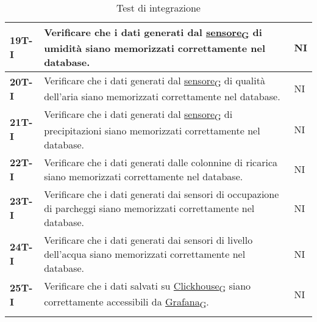 \begin{longtable}{|>{\raggedright\arraybackslash}m{}|>{\raggedright\arraybackslash}m{}|>{\raggedright\arraybackslash}m{}|}
	\hline
	\textbf{19T-I}  & Verificare che i dati generati dal \href{https://7last.github.io/docs/rtb/documentazione-interna/glossario\#sensore}{sensore\textsubscript{G}} di umidità siano memorizzati correttamente nel database.                                  & NI             \\
	\hline
	\textbf{20T-I}  & Verificare che i dati generati dal \href{https://7last.github.io/docs/rtb/documentazione-interna/glossario\#sensore}{sensore\textsubscript{G}} di qualità dell'aria siano memorizzati correttamente nel database.                        & NI             \\
	\hline
	\textbf{21T-I}  & Verificare che i dati generati dal \href{https://7last.github.io/docs/rtb/documentazione-interna/glossario\#sensore}{sensore\textsubscript{G}} di precipitazioni siano memorizzati correttamente nel database.                           & NI             \\
	\hline
	\textbf{22T-I}  & Verificare che i dati generati dalle colonnine di ricarica siano memorizzati correttamente nel database.                             & NI             \\
	\hline
	\textbf{23T-I}  & Verificare che i dati generati dai sensori di occupazione di parcheggi siano memorizzati correttamente nel database.                 & NI             \\
	\hline
	\textbf{24T-I}  & Verificare che i dati generati dai sensori di livello dell'acqua siano memorizzati correttamente nel database.                       & NI             \\
	\hline
	\textbf{25T-I}  & Verificare che i dati salvati su \href{https://7last.github.io/docs/rtb/documentazione-interna/glossario\#clickhouse}{Clickhouse\textsubscript{G}} siano correttamente accessibili da \href{https://7last.github.io/docs/rtb/documentazione-interna/glossario\#grafana}{Grafana\textsubscript{G}}.                                              & NI             \\
	\hline
	\caption{Test di integrazione}
\end{longtable}

\newpage
